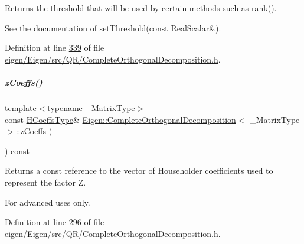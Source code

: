 Returns the threshold that will be used by certain methods such as \hyperlink{group___q_r___module_af348f64b26f8467a020062c22b748806}{rank()}.

See the documentation of \hyperlink{group___q_r___module_aa9c9f7cbde9d58ca5552381b70ad8d82}{set\+Threshold(const Real\+Scalar\&)}. 

Definition at line \hyperlink{eigen_2_eigen_2src_2_q_r_2_complete_orthogonal_decomposition_8h_source_l00339}{339} of file \hyperlink{eigen_2_eigen_2src_2_q_r_2_complete_orthogonal_decomposition_8h_source}{eigen/\+Eigen/src/\+Q\+R/\+Complete\+Orthogonal\+Decomposition.\+h}.

\mbox{\label{group___q_r___module_a0b28c24992d313d4b04d109dcc7e5220}} 
\subparagraph{\texorpdfstring{z\+Coeffs()}{zCoeffs()}\hspace{0.1cm}{\footnotesize\ttfamily [1/2]}}
{\footnotesize\ttfamily template$<$typename \+\_\+\+Matrix\+Type$>$ \\
const \hyperlink{class_eigen_1_1internal_1_1_tensor_lazy_evaluator_writable}{H\+Coeffs\+Type}\& \hyperlink{group___q_r___module_class_eigen_1_1_complete_orthogonal_decomposition}{Eigen\+::\+Complete\+Orthogonal\+Decomposition}$<$ \+\_\+\+Matrix\+Type $>$\+::z\+Coeffs (\begin{DoxyParamCaption}{ }\end{DoxyParamCaption}) const\hspace{0.3cm}{\ttfamily [inline]}}

\begin{DoxyReturn}{Returns}
a const reference to the vector of Householder coefficients used to represent the factor {\ttfamily Z}.
\end{DoxyReturn}
For advanced uses only. 

Definition at line \hyperlink{eigen_2_eigen_2src_2_q_r_2_complete_orthogonal_decomposition_8h_source_l00296}{296} of file \hyperlink{eigen_2_eigen_2src_2_q_r_2_complete_orthogonal_decomposition_8h_source}{eigen/\+Eigen/src/\+Q\+R/\+Complete\+Orthogonal\+Decomposition.\+h}.

